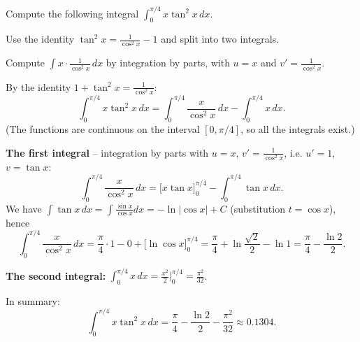 
\begin{question}
Compute the following integral $\displaystyle\int_0^{\pi/4} x\tan^2 x\,dx$.
\end{question}

\begin{hint}
Use the identity $\tan^2 x = \frac{1}{\cos^2 x}-1$ and split into two integrals.
\end{hint}

\begin{hint}
Compute $\int x\cdot\frac{1}{\cos^2 x}\,dx$ by integration by parts, with $u=x$ and $v'=\frac{1}{\cos^2x}$.
\end{hint}

\begin{solution}
By the identity $1+\tan^2 x = \frac{1}{\cos^2 x}$:
\[ \int_0^{\pi/4} x\tan^2 x\,dx = \int_0^{\pi/4} \frac{x}{\cos^2 x}\,dx - \int_0^{\pi/4} x\,dx. \]
(The functions are continuous on the interval $[0,\pi/4]$, so all the integrals exist.)

\textbf{The first integral} -- integration by parts with $u=x$, $v'=\frac{1}{\cos^2x}$, i.e. $u'=1$, $v=\tan x$:
\[ \int_0^{\pi/4}\frac{x}{\cos^2x}\,dx = \Big[x\tan x\Big]_0^{\pi/4} - \int_0^{\pi/4}\tan x\,dx. \]
We have $\int \tan x\,dx = \int\frac{\sin x}{\cos x}dx = -\ln|\cos x|+C$ (substitution $t=\cos x$), hence
\[ \int_0^{\pi/4}\frac{x}{\cos^2x}\,dx = \frac{\pi}{4}\cdot 1 - 0 + \Big[\ln\cos x\Big]_0^{\pi/4} = \frac{\pi}{4} + \ln\frac{\sqrt2}{2} - \ln 1 = \frac{\pi}{4} - \frac{\ln 2}{2}. \]

\textbf{The second integral:} $\displaystyle\int_0^{\pi/4}x\,dx = \frac{x^2}{2}\Big|_0^{\pi/4} = \frac{\pi^2}{32}$.

In summary:
\[ \int_0^{\pi/4} x\tan^2 x\,dx = \frac{\pi}{4} - \frac{\ln 2}{2} - \frac{\pi^2}{32} \approx 0.1304. \]
\end{solution}
